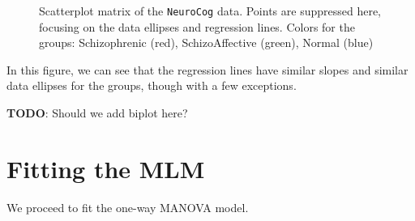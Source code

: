 \documentclass[
  letterpaper,
  10pt,
  krantz2]{krantz}
\begin{document}
\begin{figure}[H]


\caption{\label{fig-NC-scatmat}Scatterplot matrix of the
\texttt{NeuroCog} data. Points are suppressed here, focusing on the data
ellipses and regression lines. Colors for the groups: Schizophrenic
(red), SchizoAffective (green), Normal (blue)}

\end{figure}%

In this figure, we can see that the regression lines have similar slopes
and similar data ellipses for the groups, though with a few exceptions.

\textbf{TODO}: Should we add biplot here?

\section{Fitting the MLM}\label{fitting-the-mlm}

We proceed to fit the one-way MANOVA model.
\end{document}
